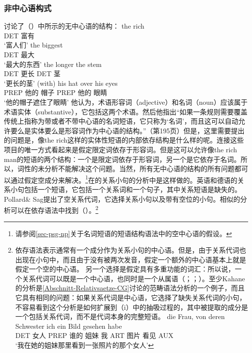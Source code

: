 %
\subsubsection{非中心语构式}
\label{sec-headless-constructions-dg}
%
\citet[\S~4.E]{Hudson80a}讨论了（）中所示的无中心语的结构：
\eal
\ex 
\gll the rich\\
DET 富有\\
\glt `富人们'
\ex 
\gll the biggest\\
DET 最大\\
\glt `最大的东西'
\ex 
\gll the longer the stem\\
DET 更长 DET 茎\\
\glt `更长的茎'
\ex 
\gll (with) his hat over his eyes\\
PREP 他的 帽子 PREP 他的 眼睛\\
\glt `他的帽子遮住了眼睛'
\zl
他认为，术语形容词（adjective）和名词（noun）应该属于术语实体（substantive），它包括这两个术语。然后他指出“如果一条规则需要覆盖传统上指称为带或者不带中心语的名词短语，它只称为‘名词’，而且这可以自动允许要么是实体要么是形容词作为中心语的结构。”（第195页）但是，这里需要提出的问题是，像the rich这样的实体性短语的内部依存结构是什么样的呢。连接这些项目的唯一方式看起来是假定限定词依存于形容词。但是这可以允许像the rich man的短语的两个结构：一个是限定词依存于形容词，另一个是它依存于名词。所以，词性的未分析不能解决这个问题。当然，所有无中心语的结构的所有问题都可以通过假定空成分来解决。\footnote{请参阅\ref{sec-psg-np}关于名词短语的短语结构语法中的空中心语的假设。}在\hpsgc 的关系小句的分析中是这样做的\citep[\S~5]{ps2}。英语和德语的关系小句包括一个短语，它包括一个关系词和一个句子，其中关系短语是缺失的。Pollard\& Sag提出了空关系代词，它选择关系小句以及带有空位的小句\citep[--217]{ps2}。相似的分析可以在依存语法中找到（\citealp[]{Eroms2000a}）。\footnote{
依存语法表示通常有一个成分作为关系小句的中心语。但是，由于关系代词也出现在小句中，而且由于没有被两次发音，假定一个额外的中心语基本上就是假定一个空的中心语。
%
另一个选择是假定具有多重功能的词汇：所以说，一个关系代词可以既是一个中心语，也同时是一个从属语（\citealp[\S 246, §8--11]{Tesniere2015a-not-crossreferenced}；\citealp[\page xlvi]{OK2015a}；\citealp[--130]{Kahane2009a}）。至少Kahane的分析是\ref{Abschnitt-Relativsaetze-CG}讨论的范畴语法分析的一个例子，而且它具有相同的问题：如果关系代词是中心语，它选择了缺失关系代词的小句，不容易看到这个分析是如何扩展到（i）中的抽吸过程的，其中被提取的成分是一个包括关系代词，而不是代词本身的完整短语。
\ea
\gll die Frau, von deren Schwester ich ein Bild gesehen habe\\
     DET 女人 PREP 谁的 姐妹 我 ART 图片 看见 AUX\\
\glt `我在她的姐妹那里看到一张照片的那个女人'
\zlast
}
